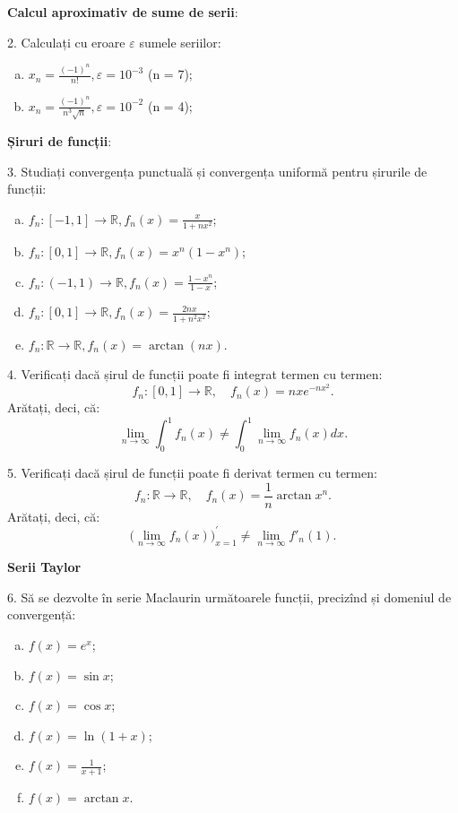 \documentclass[11pt,a4paper]{article}
\newcommand\RR{\mathbb{R}}
\theoremstyle{dotless}
\theoremstyle{dotlessdr}
\begin{document}
\vspace{1cm}

\textbf{Calcul aproximativ de sume de serii}:

2. Calculați cu eroare $\varepsilon$ sumele seriilor:
\begin{enumerate}[(a)]
\item $x_n = \frac{(-1)^n}{n!}, \varepsilon = 10^{-3}$ \hfill (n = 7);
\item $x_n = \frac{(-1)^n}{n^3 \sqrt{n}}, \varepsilon = 10^{-2}$ \hfill (n = 4);
\end{enumerate}

\textbf{Șiruri de funcții}:

3. Studiați convergența punctuală și convergența uniformă pentru șirurile
de funcții:
\begin{enumerate}[(a)]
\item $f_n : [-1, 1] \to \RR, f_n(x) = \frac{x}{1 + nx^2}$;
\item $f_n : [0, 1] \to \RR, f_n(x) = x^n(1 - x^n)$;
\item $f_n : (-1, 1) \to \RR, f_n(x) = \frac{1 - x^n}{1 - x}$;
\item $f_n : [0, 1] \to \RR, f_n(x) = \frac{2nx}{1 + n^2 x^2}$;
\item $f_n : \RR \to \RR, f_n(x) = \arctan(nx)$.
\end{enumerate}

\vspace{1cm}

4. Verificați dacă șirul de funcții poate fi integrat termen cu termen:
\[
  f_n : [0, 1] \to \RR, \quad f_n(x) = nxe^{-nx^2}.
\]
Arătați, deci, că:
\[
  \lim_{n \to \infty} \int_0^1 f_n(x) \neq \int_0^1 \lim_{n \to \infty} f_n(x) dx.
\]

\vspace{1cm}

5. Verificați dacă șirul de funcții poate fi derivat termen cu termen:
\[
  f_n : \RR \to \RR, \quad f_n(x) = \frac{1}{n} \arctan x^n.
\]
Arătați, deci, că:
\[
  \Big( \lim_{n\to \infty} f_n(x) \Big)^\prime_{x = 1} \neq %
  \lim_{n \to \infty} f'_n(1).
\]


\textbf{Serii Taylor}

6. Să se dezvolte în serie Maclaurin următoarele funcții, precizînd și
domeniul de convergență:
\begin{enumerate}[(a)]
\item $f(x) = e^x$;
\item $f(x) = \sin x$;
\item $f(x) = \cos x$;
\item $f(x) = \ln(1 + x)$;
\item $f(x) = \frac{1}{x + 1}$;
\item $f(x) = \arctan x$.
\end{enumerate}
\end{document}
